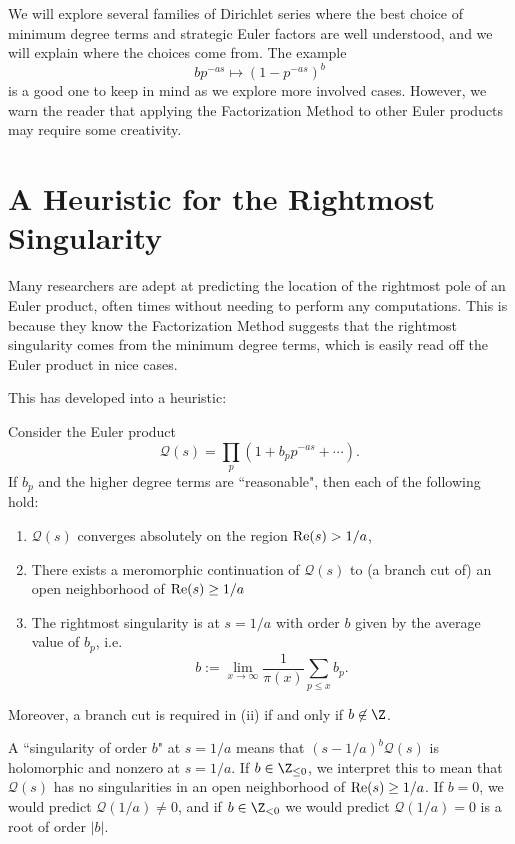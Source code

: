 \documentclass[12pt]{amsart}
\theoremstyle{plain}
\begin{document}
We will explore several families of Dirichlet series where the best choice of minimum degree terms and strategic Euler factors are well understood, and we will explain where the choices come from. The example
\[
b p^{-as} \longmapsto (1-p^{-as})^b
\]
is a good one to keep in mind as we explore more involved cases. However, we warn the reader that applying the Factorization Method to other Euler products may require some creativity.


\section{A Heuristic for the Rightmost Singularity}\label{sec:right}

Many researchers are adept at predicting the location of the rightmost pole of an Euler product, often times without needing to perform any computations. This is because they know the Factorization Method suggests that the rightmost singularity comes from the minimum degree terms, which is easily read off the Euler product in nice cases.

This has developed into a heuristic:

\begin{heuristic}\label{heur}
Consider the Euler product
\[
\mathcal{Q}(s) = \prod_p \left(1 + b_p p^{-as} + \cdots\right).
\]
If $b_p$ and the higher degree terms are ``reasonable", then each of the following hold:
\begin{enumerate}
    \item[(i)] $\mathcal{Q}(s)$ converges absolutely on the region ${\rm Re}(s)>1/a$,
    \item[(ii)] There exists a meromorphic continuation of $\mathcal{Q}(s)$ to (a branch cut of) an open neighborhood of ${\rm Re}(s) \ge 1/a$
    \item[(iii)] The rightmost singularity is at $s=1/a$ with order $b$ given by the average value of $b_p$, i.e.
    \[
    b:=\lim_{x\to \infty}\frac{1}{\pi(x)}\sum_{p\le x}b_p.
    \]
\end{enumerate}
Moreover, a branch cut is required in (ii) if and only if $b\not\in \Z$.
\end{heuristic}

A ``singularity of order $b$" at $s=1/a$ means that $(s-1/a)^b\mathcal{Q}(s)$ is holomorphic and nonzero at $s=1/a$. If $b\in \Z_{\le 0}$, we interpret this to mean that $\mathcal{Q}(s)$ has no singularities in an open neighborhood of ${\rm Re}(s) \ge 1/a$. If $b=0$, we would predict $\mathcal{Q}(1/a) \ne 0$, and if $b\in \Z_{<0}$ we would predict $\mathcal{Q}(1/a) = 0$ is a root of order $|b|$.
\end{document}
